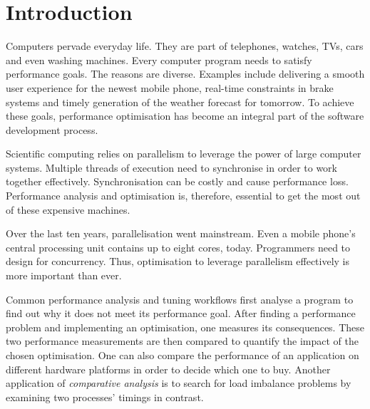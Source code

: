 \documentclass[a4paper, final, diplominf]{zih-template}
\begin{document}

\chapter{Introduction}
\label{sec:introduction}
Computers pervade everyday life.
They are part of telephones, watches, TVs, cars and even washing machines.
Every computer program needs to satisfy performance goals.
The reasons are diverse.
Examples include delivering a smooth user experience for the newest mobile phone, real-time constraints in brake systems and timely generation of the weather forecast for tomorrow.
To achieve these goals, performance optimisation has become an integral part of the software development process.

Scientific computing relies on parallelism to leverage the power of large computer systems.
Multiple threads of execution need to synchronise in order to work together effectively.
Synchronisation can be costly and cause performance loss.
Performance analysis and optimisation is, therefore, essential to get the most out of these expensive machines.

Over the last ten years, parallelisation went mainstream.
Even a mobile phone's central processing unit contains up to eight cores, today.
Programmers need to design for concurrency.
Thus, optimisation to leverage parallelism effectively is more important than ever.

Common performance analysis and tuning workflows first analyse a program to find out why it does not meet its performance goal.
After finding a performance problem and implementing an optimisation, one measures its consequences.
These two performance measurements are then compared to quantify the impact of the chosen optimisation.
One can also compare the performance of an application on different hardware platforms in order to decide which one to buy.
Another application of \emph{comparative analysis} is to search for load imbalance problems by examining two processes' timings in contrast.
\end{document}
